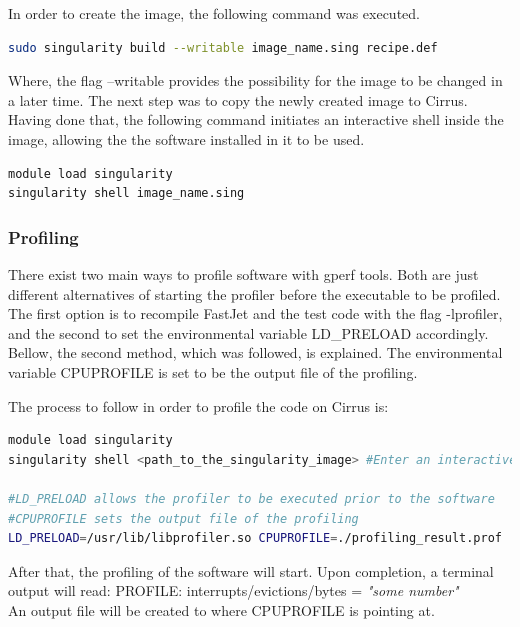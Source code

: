 

In order to create the image, the following command was executed.

\begin{lstlisting}[language=bash]
sudo singularity build --writable image_name.sing recipe.def
\end{lstlisting}

Where, the flag --writable provides the possibility for the image to be changed in a later time. The next step was to copy the newly created image to Cirrus. Having done that, the following command initiates an interactive shell inside the image, allowing the the software installed in it to be used.

\begin{lstlisting}[language=bash]
module load singularity
singularity shell image_name.sing
\end{lstlisting}

\subsubsection{Profiling}\label{ch:gerf1}
There exist two main ways to profile software with gperf tools. Both are just different alternatives of starting the profiler before the executable to be profiled. The first option is to recompile FastJet and the test code with the flag -lprofiler, and the second to set the environmental variable LD\_PRELOAD accordingly. Bellow, the second method, which was followed, is explained. The environmental variable CPUPROFILE is set to be the output file of the profiling.

The process to follow in order to profile the code on Cirrus is: 
\begin{lstlisting}[language=bash]
module load singularity
singularity shell <path_to_the_singularity_image> #Enter an interactive shell where gperf tools are installed

#LD_PRELOAD allows the profiler to be executed prior to the software
#CPUPROFILE sets the output file of the profiling
LD_PRELOAD=/usr/lib/libprofiler.so CPUPROFILE=./profiling_result.prof ./<path_to_executable> #in one command
\end{lstlisting}

After that, the profiling of the software will start. Upon completion, a terminal output will read:  PROFILE: interrupts/evictions/bytes = \textit{"some number"}\\ An output file will be created to where CPUPROFILE is pointing at. 

